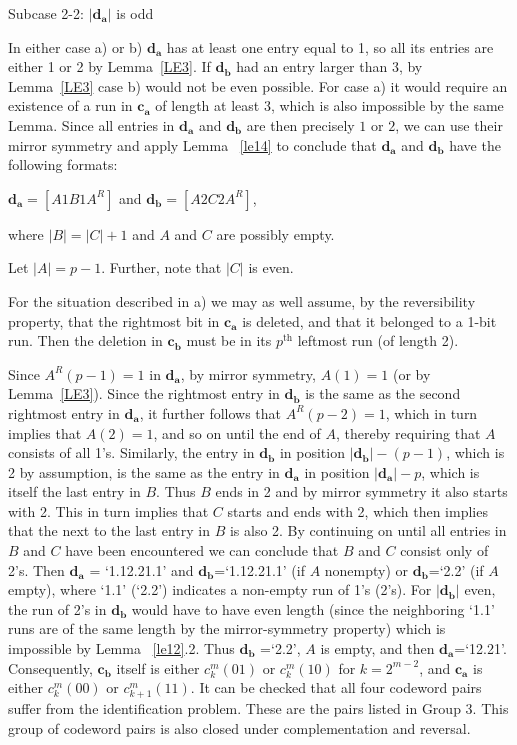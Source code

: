 Subcase 2-2: $|\mathbf{d_a}|$ is odd

In either case a) or b) $\mathbf{d_a}$ has at least one entry
equal to 1, so all its entries are either 1 or 2 by
Lemma~\ref{LE3}. If $\mathbf{d_b}$ had an entry larger than 3, by
Lemma~\ref{LE3} case b) would not be even possible. For case a) it
would require an existence of a run in $\mathbf{c_a}$ of length at
least 3, which is also impossible by the same Lemma. Since all
entries in $\mathbf{d_a}$ and $\mathbf{d_b}$ are then precisely
$1$ or $2$, we can use their mirror symmetry and
apply Lemma ~\ref{le14} to
conclude that $\mathbf{d_a}$ and $\mathbf{d_b}$ have the following formats:

$\mathbf{d_a}=[A1B1A^R]$ and $\mathbf{d_b}=[A2C2A^R]$,

where $|B|=|C|+1$ and $A$ and $C$ are possibly empty.

Let $|A|=p-1$. Further, note that $|C|$ is even.

For the situation described in a) we may as well assume, by the
reversibility property, that the rightmost bit in $\mathbf{c_a}$ is
deleted, and that it belonged to a 1-bit run. Then the deletion in
$\mathbf{c_b}$ must be in its $p^{\text{th}}$ leftmost run (of
length 2).

Since $A^R(p-1)=1$ in $\mathbf{d_a}$, by mirror symmetry, $A(1)=1$
(or by Lemma~\ref{LE3}). Since the rightmost entry in
$\mathbf{d_b}$ is the same as the second rightmost entry in
$\mathbf{d_a}$, it further follows that $A^R(p-2)=1$, which in
turn implies that $A(2)=1$, and so on until the end of $A$,
thereby requiring that $A$ consists of all 1's. Similarly, the
entry in $\mathbf{d_b}$ in position $|\mathbf{d_b}|-(p-1)$, which
is 2 by assumption, is the same as the entry in $\mathbf{d_a}$ in
position $|\mathbf{d_a}|-p$, which is itself the last entry in
$B$. Thus $B$ ends in 2 and by mirror symmetry it also starts with
2. This in turn implies that $C$ starts and ends with 2, which
then implies that the next to the last entry in $B$ is also 2. By
continuing on until all entries in $B$ and $C$ have been
encountered we can conclude that $B$ and $C$ consist only of 2's.
Then $\mathbf{d_a}$ = `1.12.21.1' and $\mathbf{d_b}$=`1.12.21.1'
(if $A$ nonempty) or $\mathbf{d_b}$=`2.2' (if $A$ empty), where
`1.1' (`2.2') indicates a non-empty run of 1's (2's). For
$|\mathbf{d_b}|$ even, the run of 2's in $\mathbf{d_b}$ would have
to have even length (since the neighboring `1.1' runs are of the
same length by the mirror-symmetry property) which is impossible
by Lemma ~\ref{le12}.2. Thus $\mathbf{d_b}$ =`2.2', $A$ is empty,
and then $\mathbf{d_a}$=`12.21'. Consequently, $\mathbf{c_b}$
itself is either $c_k^m(01)$ or $c_k^m(10)$ for $k=2^{m-2}$, and
$\mathbf{c_a}$ is either $c_k^m(00)$ or $c_{k+1}^m(11)$. It can be
checked that all four codeword pairs suffer from the
identification problem. These are the pairs listed in Group 3.
This group of codeword pairs is also closed under complementation
and reversal.

